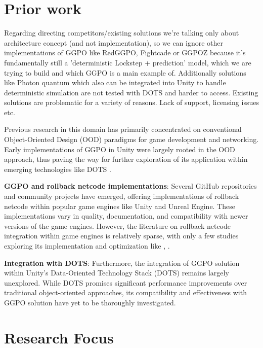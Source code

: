 \section{Prior work}

Regarding directing competitors/existing solutions we're talking only about architecture concept (and not implementation), so we can ignore other implementations of GGPO like RedGGPO, Fightcade or GGPOZ because it's fundamentally still a 'deterministic Lockstep + prediction' model, which we are trying to build and which GGPO is a main example of. Additionally solutions like Photon quantum which also can be integrated into Unity to handle deterministic simulation are not tested with DOTS and harder to access. Existing solutions are problematic for a variety of reasons. Lack of support, licensing issues etc. %

Previous research in this domain has primarily concentrated on conventional Object-Oriented Design (OOD) paradigms for game development and networking. Early implementations of GGPO in Unity were largely rooted in the OOD approach, thus paving the way for further exploration of its application within emerging technologies like DOTS \cite{UnityGGPO}.

\noindent\textbf{GGPO and rollback netcode implementations}:
Several GitHub repositories and community projects have emerged, offering implementations of rollback netcode within popular game engines like Unity and Unreal Engine. These implementations vary in quality, documentation, and compatibility with newer versions of the game engines. However, the literature on rollback netcode integration within game engines is relatively sparse, with only a few studies exploring its implementation and optimization like \cite{ECS_unity_implementation}, \cite{Lockstep_Unity}.

\noindent\textbf{Integration with DOTS}:
Furthermore, the integration of GGPO solution within Unity's Data-Oriented Technology Stack (DOTS) remains largely unexplored. While DOTS promises significant performance improvements over traditional object-oriented approaches, its compatibility and effectiveness with GGPO solution have yet to be thoroughly investigated.

\section{Research Focus}

